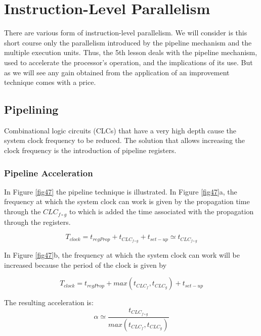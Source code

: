 \chapter{Instruction-Level Parallelism}\label{lect5}


There are various form of instruction-level parallelism. We will consider is this short course only the parallelism introduced by the pipeline mechanism and the multiple execution units.
Thus, the 5th lesson deals with the pipeline mechanism, used to accelerate the processor's operation, and the implications of its use. But as we will see any gain obtained from the application of an improvement technique comes with a price.

\section{Pipelining}

Combinational logic circuits (CLCs) that have a very high depth cause the system clock frequency to be reduced. The solution that allows increasing the clock frequency is the introduction of pipeline registers.


\subsection{Pipeline Acceleration}

In Figure \ref{fig47} the pipeline technique is illustrated. In Figure \ref{fig47}a, the frequency at which the system clock can work is given by the propagation time through the $CLC_{f \circ g}$ to which is added the time associated with the propagation through the registers.



$$T_{clock} = t_{regProp} + t_{CLC_{f \circ g}} + t_{set-up} \simeq t_{CLC_{f \circ g}}$$

In Figure \ref{fig47}b,  the frequency at which the system clock can work will be increased because the period of the clock is given by

$$T_{clock} = t_{regProp} + max(t_{CLC_{f}}, t_{CLC_{g}}) + t_{set-up}$$

The resulting acceleration is:
$$\alpha \simeq \frac{t_{CLC_{f \circ g}}}{max(t_{CLC_{f}}, t_{CLC_{g}})}$$

